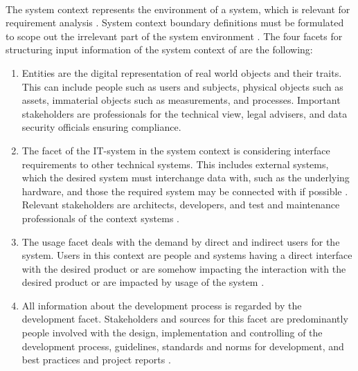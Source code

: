\paragraph{} The system context represents the environment of a system, which is relevant for requirement analysis \parencite[55]{Pohl.2007}. System context boundary definitions must be formulated to scope out the irrelevant part of the system environment \parencite[55-56]{Pohl.2007}. The four facets for structuring input information of the system context of \textcite{Pohl.2007} are the following:
\begin{enumerate}
    \item Entities are the digital representation of real world objects and their traits. This can include people such as users and subjects, physical objects such as assets, immaterial objects such as measurements, and processes. Important stakeholders are  professionals for the technical view, legal advisers, and data security officials ensuring compliance. \parencite[cf.][70-71]{Pohl.2007}
    \item The facet of the IT-system in the system context is considering interface requirements to other technical systems. This includes external systems, which the desired system must interchange data with, such as the underlying hardware, and those the required system may be connected with if possible \parencite[cf.][192]{Kotonya.2000}. Relevant stakeholders are architects, developers, and test and maintenance professionals of the context systems \parencite[cf.][72]{Pohl.2007}.
    \item The usage facet deals with the demand by direct and indirect users for the system. Users in this context are people and systems having a direct interface with the desired product or are somehow impacting the interaction with the desired product or are impacted by usage of the system \parencite[cf.][75-77]{Pohl.2007}.
    \item All information about the development process is regarded by the development facet. Stakeholders and sources for this facet are predominantly people involved with the design, implementation and controlling of the development process, guidelines, standards and norms for development, and best practices and project reports \parencite[cf.][79]{Pohl.2007}.
\end{enumerate}
\label{endFacet}

